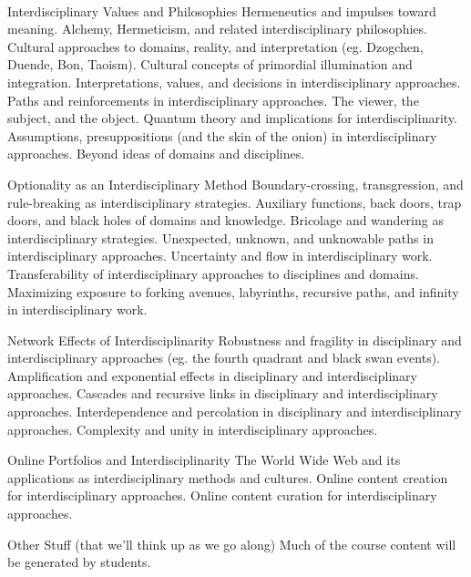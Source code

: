 \documentclass[letterpaper,10pt,headsepline]{scrreprt}
\begin{document}
\begin{compactdesc}
\\
\item[Interdisciplinary Values and Philosophies]
Hermeneutics and impulses toward meaning. Alchemy, Hermeticism, and related interdisciplinary philosophies. Cultural approaches to domains, reality, and interpretation (eg. Dzogchen, Duende, Bon, Taoism). Cultural concepts of primordial illumination and integration. Interpretations, values, and decisions in interdisciplinary approaches. Paths and reinforcements in interdisciplinary approaches. The viewer, the subject, and the object. Quantum theory and implications for interdisciplinarity. Assumptions, presuppositions (and the skin of the onion) in interdisciplinary approaches. Beyond ideas of domains and disciplines.
\\
\item[Optionality as an Interdisciplinary Method]
Boundary-crossing, transgression, and rule-breaking as interdisciplinary strategies. Auxiliary functions, back doors, trap doors, and black holes of domains and knowledge. Bricolage and wandering as interdisciplinary strategies. Unexpected, unknown, and unknowable paths in interdisciplinary approaches. Uncertainty and flow in interdisciplinary work. Transferability of interdisciplinary approaches to disciplines and domains. Maximizing exposure to forking avenues, labyrinths, recursive paths, and infinity in interdisciplinary work. 
\\
\item[Network Effects of Interdisciplinarity]
Robustness and fragility in disciplinary and interdisciplinary approaches (eg. the fourth quadrant and black swan events). Amplification and exponential effects in disciplinary and interdisciplinary approaches. Cascades and recursive links in disciplinary and interdisciplinary approaches. Interdependence and percolation in disciplinary and interdisciplinary approaches. Complexity and unity in interdisciplinary approaches.
\\
\item[Online Portfolios and Interdisciplinarity]
The World Wide Web and its applications as interdisciplinary methods and cultures. Online content creation for interdisciplinary approaches. Online content curation for interdisciplinary approaches.
\\
\item[Other Stuff (that we'll think up as we go along)]
Much of the course content will be generated by students.
\end{compactdesc}
\clearpage
\end{document}
